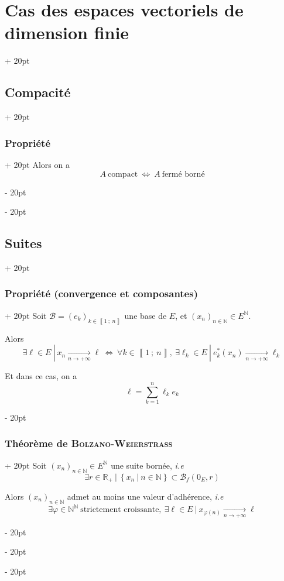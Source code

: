 \documentclass[a4paper, 12pt, twoside]{article}
\newcommand{\N}{\mathbb{N}} %
\newcommand{\R}{\mathbb{R}} %
\newcommand{\nset}[2]{\left\llbracket #1\ ;\ #2 \right\rrbracket}
\newcommand{\tendsto}[1]{\xrightarrow[#1]{}}
\newcommand{\lr}[1]{\left( #1 \right)}
\newcommand{\set}[1]{\left\{ #1 \right\}}
\newcommand{\ssi}{\ \Leftrightarrow \ }
\newcommand{\ind}[1][20pt]{\advance\leftskip + #1}
\newcommand{\deind}[1][20pt]{\advance\leftskip - #1}
\newenvironment{indt}[2][20pt]{#2 \par \ind[#1]}{\par \deind} %
\begin{document}
\begin{indt}{\section{Cas des espaces vectoriels de dimension finie}}
\begin{indt}{\subsection{Compacité}}
\begin{indt}{\subsubsection{Propriété}}
                Alors on a
                \[
                    A\ \text{compact}
                    \ssi
                    A\ \text{fermé borné}
                \]
            \end{indt}
        \end{indt}

        \vspace{12pt}
        
        \begin{indt}{\subsection{Suites}}
            \begin{indt}{\subsubsection{Propriété (convergence et composantes)}}
                Soit $\mathcal B = \lr{e_k}_{k \in \nset 1 n}$ une base de $E$, et $\lr{x_n}_{n \in \N} \in E^\N$.

                Alors
                \[
                    \exists \ell \in E\ |\ x_n \tendsto{n \to +\infty} \ell
                    \ssi
                    \forall k \in \nset 1 n,\
                    \exists \ell_k \in E\ |\ e_k^*(x_n) \tendsto{n \to +\infty} \ell_k
                \]

                Et dans ce cas, on a
                \[
                    \ell = \sum_{k = 1}^n \ell_k e_k
                \]
            \end{indt}

            \vspace{12pt}
            
            \begin{indt}{\subsubsection{Théorème de \textsc{Bolzano-Weierstrass}}}
                Soit $\lr{x_n}_{n \in \N} \in E^\N$ une suite bornée, \textit{i.e}
                \[
                    \exists r \in \R_+\ |\ \set{x_n\ |\ n \in \N} \subset \mathscr B_f(0_E, r)
                \]

                Alors $\lr{x_n}_{n \in \N}$ admet au moins une valeur d'adhérence, \textit{i.e}
                \[
                    \exists \varphi \in \N^\N\ \text{strictement croissante},\
                    \exists \ell \in E\ |\
                    x_{\varphi(n)} \tendsto{n \to +\infty} \ell
                \]
            \end{indt}


\end{indt}
\end{indt}
\end{document}
